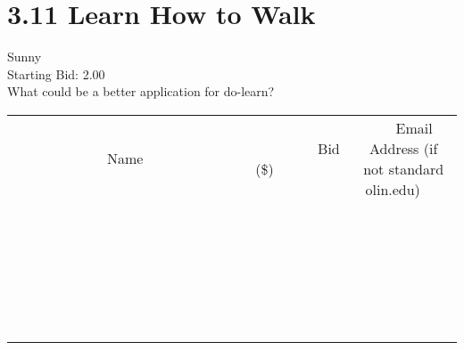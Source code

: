 \documentclass[11pt]{article}
\begin{document}
					\section*{3.11 Learn How to Walk}
					Sunny \\
					Starting Bid: 2.00 \\
					What could be a better application for do-learn? \\
					[6ex]
					\begin{tabular}{c c c}
						~~~~~~~~~~~~~Name~~~~~~~~~~~~~ & ~~~~~~~~~Bid (\$)~~~~~~~~~ & ~~~Email Address (if not standard olin.edu)~~~ \\
				
 & & \\
\hline
 & & \\
\hline
 & & \\
\hline
 & & \\
\hline
 & & \\
\hline
 & & \\
\hline
 & & \\
\hline
 & & \\
\hline
 & & \\
\hline
 & & \\
\hline
 & & \\
\hline
 & & \\
\hline
 & & \\
\hline
 & & \\
\hline
 & & \\
\hline
 & & \\
\hline
 & & \\
\hline
 & & \\
\hline
 & & \\
\hline
 & & \\
\hline
 & & \\
\hline
 & & \\
\hline
 & & \\
\hline
 & & \\
\hline
 & & \\
\hline
 & & \\
\hline
					\end{tabular}
					\clearpage
				
\end{document}
